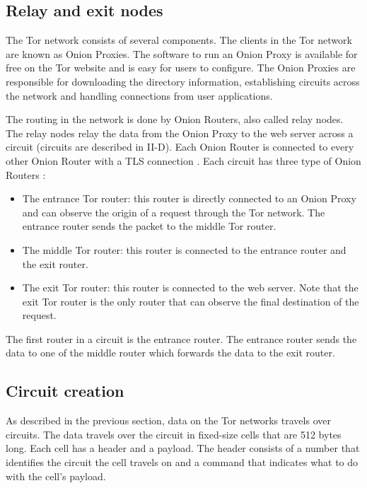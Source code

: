 \documentclass{article}
\begin{document}
	\subsection{Relay and exit nodes}
		The Tor network consists of several components. The clients in the Tor network are known as Onion Proxies. The software to run an Onion Proxy is available for free on the Tor website \cite{torprojectwebsite} and is easy for users to configure. The Onion Proxies are responsible for downloading the directory information, establishing circuits across the network and handling connections from user applications.
		
		The routing in the network is done by Onion Routers, also called relay nodes. The relay nodes relay the data from the Onion Proxy to the web server across a circuit (circuits are described in II-D). Each Onion Router is connected to every other Onion Router with a TLS connection \cite{tlsprotocol}. Each circuit has three type of Onion Routers \cite{mccoy2008shining}:
		
		\begin{itemize}
			\item{The entrance Tor router:} this router is directly connected to an Onion Proxy and can observe the origin of a request through the Tor network. The entrance router sends the packet to the middle Tor router.
			\item{The middle Tor router:} this router is connected to the entrance router and the exit router.
			\item{The exit Tor router:} this router is connected to the web server. Note that the exit Tor router is the only router that can observe the final destination of the request.
		\end{itemize}
		
		The first router in a circuit is the entrance router. The entrance router sends the data to one of the middle router which forwards the data to the exit router.
			
	\subsection{Circuit creation}
		\label{ss:tor_circuit}
		
		As described in the previous section, data on the Tor networks travels over circuits. The data travels over the circuit in fixed-size cells that are 512 bytes long. Each cell has a header and a payload. The header consists of a number that identifies the circuit the cell travels on and a command that indicates what to do with the cell’s payload.
		
\end{document}
